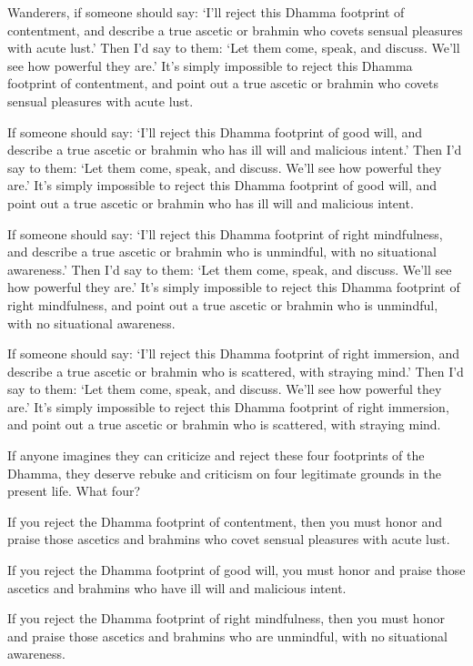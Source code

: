 \documentclass[12pt,openany]{book}%
\begin{document}
Wanderers, if someone should say: ‘I’ll reject this Dhamma footprint of contentment, and describe a true ascetic or brahmin who covets sensual pleasures with acute lust.’ Then I’d say to them: ‘Let them come, speak, and discuss. We’ll see how powerful they are.’ It’s simply impossible to reject this Dhamma footprint of contentment, and point out a true ascetic or brahmin who covets sensual pleasures with acute lust. 

If someone should say: ‘I’ll reject this Dhamma footprint of good will, and describe a true ascetic or brahmin who has ill will and malicious intent.’ Then I’d say to them: ‘Let them come, speak, and discuss. We’ll see how powerful they are.’ It’s simply impossible to reject this Dhamma footprint of good will, and point out a true ascetic or brahmin who has ill will and malicious intent. 

If someone should say: ‘I’ll reject this Dhamma footprint of right mindfulness, and describe a true ascetic or brahmin who is unmindful, with no situational awareness.’ Then I’d say to them: ‘Let them come, speak, and discuss. We’ll see how powerful they are.’ It’s simply impossible to reject this Dhamma footprint of right mindfulness, and point out a true ascetic or brahmin who is unmindful, with no situational awareness. 

If someone should say: ‘I’ll reject this Dhamma footprint of right immersion, and describe a true ascetic or brahmin who is scattered, with straying mind.’ Then I’d say to them: ‘Let them come, speak, and discuss. We’ll see how powerful they are.’ It’s simply impossible to reject this Dhamma footprint of right immersion, and point out a true ascetic or brahmin who is scattered, with straying mind. 

If anyone imagines they can criticize and reject these four footprints of the Dhamma, they deserve rebuke and criticism on four legitimate grounds in the present life. What four? 

If you reject the Dhamma footprint of contentment, then you must honor and praise those ascetics and brahmins who covet sensual pleasures with acute lust. 

If you reject the Dhamma footprint of good will, you must honor and praise those ascetics and brahmins who have ill will and malicious intent. 

If you reject the Dhamma footprint of right mindfulness, then you must honor and praise those ascetics and brahmins who are unmindful, with no situational awareness. 
\end{document}
